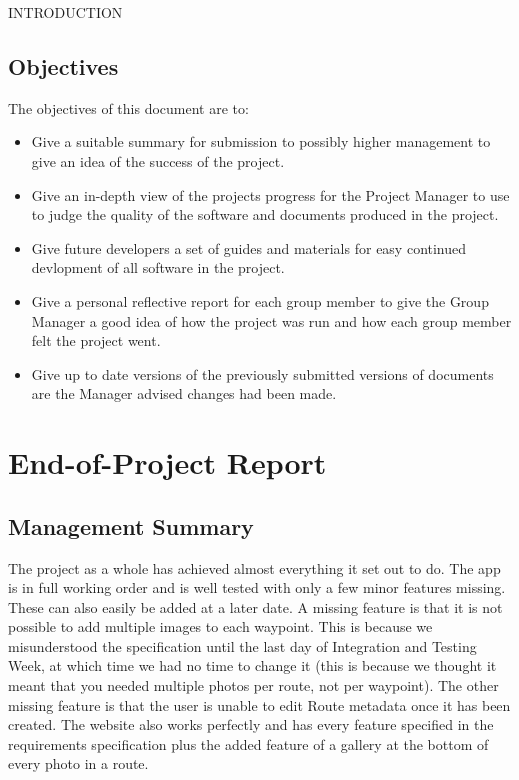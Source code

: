 \documentclass{article}
\begin{document}
\begin{section}{INTRODUCTION}
		\subsection{Objectives}
		The objectives of this document are to:
		\begin{itemize}
			\item{Give a suitable summary for submission to possibly higher management to give an idea of the success of the project.}
			\item{Give an in-depth view of the projects progress for the Project Manager to use to judge the quality of the software and documents produced in the project.}
			\item{Give future developers a set of guides and materials for easy continued devlopment of all software in the project.}
			\item{Give a personal reflective report for each group member to give the Group Manager a good idea of how the project was run and how each group member felt the project went.}
			\item{Give up to date versions of the previously submitted versions of documents are the Manager advised changes had been made.}
		\end{itemize}
	\end{section}
	
	\clearpage
	\section{End-of-Project Report}
		\subsection{Management Summary}
		The project as a whole has achieved almost everything it set out to do. The app is in full working order and is well tested with only a few minor features missing. These can also easily be added at a later date. A missing feature is that it is not possible to add multiple images to each waypoint. This is because we misunderstood the specification until the last day of Integration and Testing Week, at which time we had no time to change it (this is because we thought it meant that you needed multiple photos per route, not per waypoint). The other missing feature is that the user is unable to edit Route metadata once it has been created. The website also works perfectly and has every feature specified in the requirements specification plus the added feature of a gallery at the bottom of every photo in a route. \\
\end{document}
